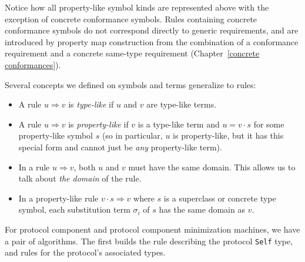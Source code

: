 \documentclass[../generics]{subfiles}
\begin{document}
Notice how all property-like symbol kinds are represented above with the exception of concrete conformance symbols. Rules containing concrete conformance symbols do not correspond directly to generic requirements, and are introduced by property map construction from the combination of a conformance requirement and a concrete same-type requirement (Chapter~\ref{concrete conformances}).
\begin{definition}
Several concepts we defined on symbols and terms generalize to rules:
\begin{itemize}
%
\item A rule $u\Rightarrow v$ is \emph{type-like} if $u$ and $v$ are type-like terms.
%
\item A rule $u\Rightarrow v$ is \emph{property-like} if $v$ is a type-like term and $u=v\cdot s$ for some property-like symbol $s$ (so in particular, $u$ is property-like, but it has this special form and cannot just be \emph{any} property-like term).
%
\item In a rule $u\Rightarrow v$, both $u$ and $v$ must have the same domain. This allows us to talk about \emph{the domain} of the rule.
\item In a property-like rule $v\cdot s\Rightarrow v$ where $s$ is a superclass or concrete type symbol, each substitution term $\sigma_i$ of $s$ has the same domain as $v$.
\end{itemize}
\end{definition}
For protocol component and protocol component minimization machines, we have a pair of algorithms. The first builds the rule describing the protocol \texttt{Self} type, and rules for the protocol's associated types.
\end{document}
